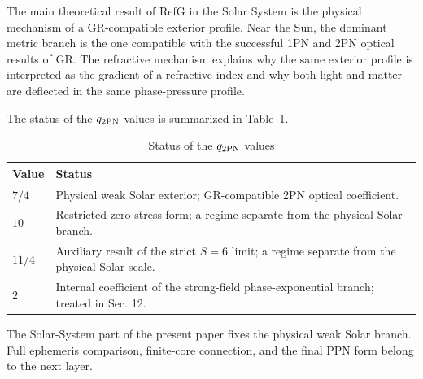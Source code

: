 \documentclass[12pt]{article}
\begin{document}
The main theoretical result of RefG in the Solar System is the physical mechanism of a GR-compatible exterior profile. Near the Sun, the dominant metric branch is the one compatible with the successful 1PN and 2PN optical results of GR. The refractive mechanism explains why the same exterior profile is interpreted as the gradient of a refractive index and why both light and matter are deflected in the same phase-pressure profile.

The status of the $q_{\rm 2PN}$ values is summarized in Table~\ref{tab:q2pn-status}.

\begin{table}[htbp]
\centering
\caption{Status of the $q_{\rm 2PN}$ values}
\label{tab:q2pn-status}
\small
\begin{tabularx}{\textwidth}{@{}>{\raggedright\arraybackslash}p{}>{\raggedright\arraybackslash}X@{}}
\toprule
Value & Status \\
\midrule
$7/4$ & Physical weak Solar exterior; GR-compatible 2PN optical coefficient. \\
$10$ & Restricted zero-stress form; a regime separate from the physical Solar branch. \\
$11/4$ & Auxiliary result of the strict $S=6$ limit; a regime separate from the physical Solar scale. \\
$2$ & Internal coefficient of the strong-field phase-exponential branch; treated in Sec. 12. \\
\bottomrule
\end{tabularx}
\end{table}

The Solar-System part of the present paper fixes the physical weak Solar branch. Full ephemeris comparison, finite-core connection, and the final PPN form belong to the next layer.
\end{document}
